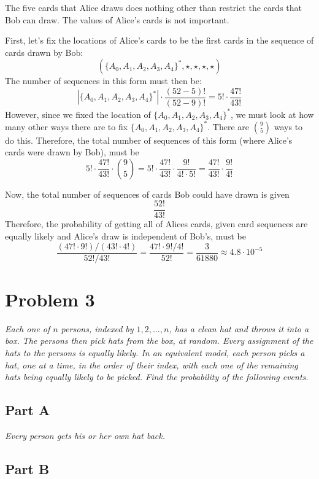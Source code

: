 \documentclass{article}
\begin{document}
\bigbreak

The five cards that Alice draws does nothing other than restrict the cards that
Bob can draw. The values of Alice's cards is not important.

First, let's fix the locations of Alice's cards to be the first cards in the
sequence of cards drawn by Bob:
$$ ( \{ A_0, A_1, A_2, A_3, A_4 \}^*, \star, \star, \star, \star ) $$
The number of sequences in this form must then be:
$$ | \{ A_0, A_1, A_2, A_3, A_4 \}^* | \cdot \frac{(52 - 5)!}{(52 - 9)!} = 5!
\cdot \frac{47!}{43!} $$
However, since we fixed the location of $ \{ A_0, A_1, A_2, A_3, A_4 \}^* $,
we must look at how many other ways there are to fix $ \{ A_0, A_1, A_2, A_3,
A_4 \}^* $. There are $ \binom{9}{5} $ ways to do this. Therefore, the total
number of sequences of this form (where Alice's cards were drawn by Bob),
must be
$$ 5! \cdot \frac{47!}{43!} \cdot \binom{9}{5} = 5! \cdot \frac{47!}{43!}
\cdot \frac{9!}{4! \cdot 5!} = \frac{47!}{43!} \cdot \frac{9!}{4!} $$

Now, the total number of sequences of cards Bob could have drawn is given
$$ \frac{52!}{43!} $$
Therefore, the probability of getting all of Alices cards, given card sequences
are equally likely and Alice's draw is independent of Bob's, must be
$$ \frac{(47! \cdot 9!) / (43! \cdot 4!)}{52! / 43!} = \frac{ 47! \cdot 9! /
4! }{ 52! } = \frac{3}{61880} \approx 4.8 \cdot 10^{-5} $$

\section*{Problem 3}

\textit{Each one of $ n $ persons, indexed by $ 1, 2, \ldots, n $, has a
clean hat and throws it into a box. The persons then pick hats from the box,
at random. Every assignment of the hats to the persons is equally likely. In
an equivalent model, each person picks a hat, one at a time, in the order of
their index, with each one of the remaining hats being equally likely to be
picked. Find the probability of the following events.}

\subsection*{Part A}

\textit{Every person gets his or her own hat back.}

\subsection*{Part B}
\end{document}
